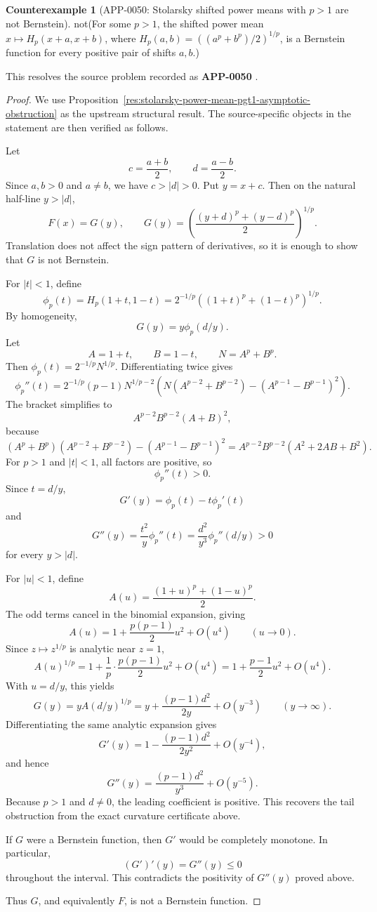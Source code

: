 \documentclass[11pt]{article}
\numberwithin{equation}{section}
\theoremstyle{definition}
\newtheorem{counterexample}[theorem]{Counterexample}
\theoremstyle{remark}
\newcommand{\1}{\mathbf 1}
\begin{document}
\begin{counterexample}[APP-0050: Stolarsky shifted power means with \(p>1\) are not Bernstein]
\label{res:not-stolarsky-power-mean-pgt1-bernstein-all-shifts}
not(For some \(p>1\), the shifted power mean \(x\mapsto H_p(x+a,x+b)\), where \(H_p(a,b)=((a^p+b^p)/2)^{1/p}\), is a Bernstein function for every positive pair of shifts \(a,b\).)



This resolves the source problem recorded as \textbf{APP-0050} \cite{app-app-0050-source}.
\end{counterexample}

\begin{proof}
We use Proposition~\ref{res:stolarsky-power-mean-pgt1-asymptotic-obstruction} as the upstream structural result. The source-specific objects in the statement are then verified as follows.

Let
\[
c=\frac{a+b}{2},\qquad d=\frac{a-b}{2}.
\]
Since \(a,b>0\) and \(a\ne b\), we have \(c>|d|>0\). Put \(y=x+c\). Then on the natural half-line \(y>|d|\),
\[
F(x)=G(y),
\qquad
G(y)=\left(\frac{(y+d)^p+(y-d)^p}{2}\right)^{1/p}.
\]
Translation does not affect the sign pattern of derivatives, so it is enough to show that \(G\) is not Bernstein.

For \(|t|<1\), define
\[
\phi_p(t)=H_p(1+t,1-t)
=2^{-1/p}\left((1+t)^p+(1-t)^p\right)^{1/p}.
\]
By homogeneity,
\[
G(y)=y\phi_p(d/y).
\]
Let
\[
A=1+t,\qquad B=1-t,\qquad N=A^p+B^p.
\]
Then \(\phi_p(t)=2^{-1/p}N^{1/p}\). Differentiating twice gives
\[
\phi_p''(t)
=2^{-1/p}(p-1)N^{1/p-2}
\left(N(A^{p-2}+B^{p-2})-(A^{p-1}-B^{p-1})^2\right).
\]
The bracket simplifies to
\[
A^{p-2}B^{p-2}(A+B)^2,
\]
because
\[
(A^p+B^p)(A^{p-2}+B^{p-2})-(A^{p-1}-B^{p-1})^2
=A^{p-2}B^{p-2}(A^2+2AB+B^2).
\]
For \(p>1\) and \(|t|<1\), all factors are positive, so
\[
\phi_p''(t)>0.
\]
Since \(t=d/y\),
\[
G'(y)=\phi_p(t)-t\phi_p'(t)
\]
and
\[
G''(y)=\frac{t^2}{y}\phi_p''(t)
=\frac{d^2}{y^3}\phi_p''(d/y)>0
\]
for every \(y>|d|\).

For \(|u|<1\), define
\[
A(u)=\frac{(1+u)^p+(1-u)^p}{2}.
\]
The odd terms cancel in the binomial expansion, giving
\[
A(u)=1+\frac{p(p-1)}{2}u^2+O(u^4)
\qquad (u\to0).
\]
Since \(z\mapsto z^{1/p}\) is analytic near \(z=1\),
\[
A(u)^{1/p}
=1+\frac1p\cdot\frac{p(p-1)}{2}u^2+O(u^4)
=1+\frac{p-1}{2}u^2+O(u^4).
\]
With \(u=d/y\), this yields
\[
G(y)
=yA(d/y)^{1/p}
=y+\frac{(p-1)d^2}{2y}+O(y^{-3})
\qquad (y\to\infty).
\]
Differentiating the same analytic expansion gives
\[
G'(y)
=1-\frac{(p-1)d^2}{2y^2}+O(y^{-4}),
\]
and hence
\[
G''(y)
=\frac{(p-1)d^2}{y^3}+O(y^{-5}).
\]
Because \(p>1\) and \(d\ne0\), the leading coefficient is positive. This recovers the tail obstruction from the exact curvature certificate above.

If \(G\) were a Bernstein function, then \(G'\) would be completely monotone. In particular,
\[
(G')'(y)=G''(y)\le0
\]
throughout the interval. This contradicts the positivity of \(G''(y)\) proved above.

Thus \(G\), and equivalently \(F\), is not a Bernstein function.
\end{proof}
\end{document}
